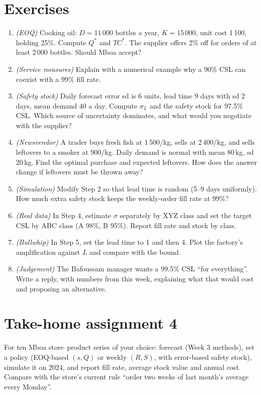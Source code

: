 \section{Exercises}
\begin{enumerate}[label=\textbf{4.\arabic*},leftmargin=2.4em]
\item \emph{(EOQ)} Cooking oil: $D=11\,000$ bottles a year, $K=15\,000$\xaf, unit cost 1\,100\xaf, holding 25\%. Compute
$Q^*$ and $TC^*$. The supplier offers 2\% off for orders of at least 2\,000 bottles. Should Mboa accept?
\item \emph{(Service measures)} Explain with a numerical example why a 90\% CSL can coexist with a 99\% fill rate.
\item \emph{(Safety stock)} Daily forecast error sd is 6 units, lead time 9 days with sd 2 days, mean demand 40 a day.
Compute $\sigma_L$ and the safety stock for 97.5\% CSL. Which source of uncertainty dominates, and what would you
negotiate with the supplier?
\item \emph{(Newsvendor)} A trader buys fresh fish at 1\,500\xaf/kg, sells at 2\,400\xaf/kg, and sells leftovers to a
smoker at 900\xaf/kg. Daily demand is normal with mean 80\,kg, sd 20\,kg. Find the optimal purchase and expected
leftovers. How does the answer change if leftovers must be thrown away?
\item \emph{(Simulation)} Modify Step 2 so that lead time is random (5--9 days uniformly). How much extra safety stock
keeps the weekly-order fill rate at 99\%?
\item \emph{(Real data)} In Step 4, estimate $\sigma$ separately by XYZ class and set the target CSL by ABC class (A
98\%, B 95\%). Report fill rate and stock by class.
\item \emph{(Bullwhip)} In Step 5, set the lead time to 1 and then 4. Plot the factory's amplification against $L$ and
compare with the bound.
\item \emph{(Judgement)} The Bafoussam manager wants a 99.5\% CSL ``for everything''. Write a reply, with numbers from
this week, explaining what that would cost and proposing an alternative.
\end{enumerate}

\section{Take-home assignment 4}
For ten Mboa store--product series of your choice: forecast (Week 3 methods), set a policy (EOQ-based $(s,Q)$ or weekly
$(R,S)$, with error-based safety stock), simulate it on 2024, and report fill rate, average stock value and annual
cost. Compare with the store's current rule ``order two weeks of last month's average every Monday''.
